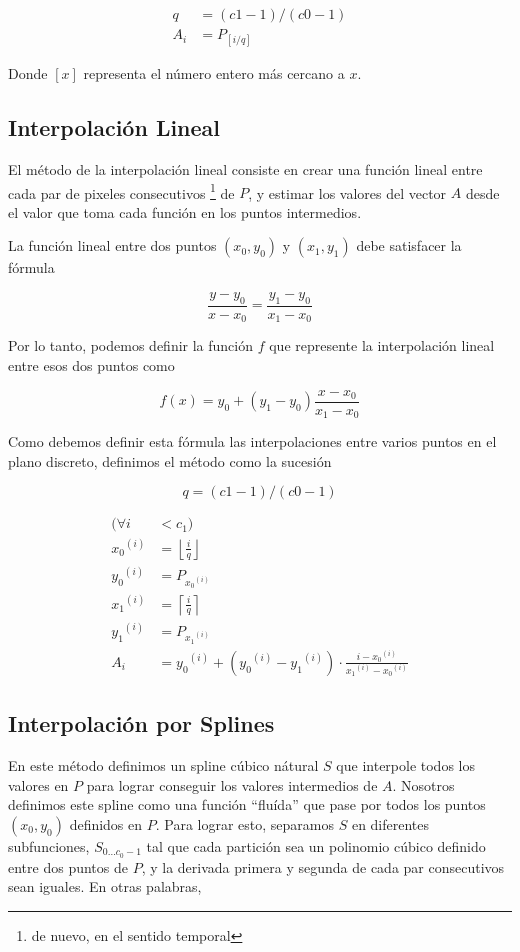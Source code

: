 \[
\begin{split}
q & = (c1 - 1) / (c0 - 1) \\
A_i & = P_{\left[i / q \right]}
\end{split}
\]

Donde $\left[x\right]$ representa el n\'umero entero m\'as cercano a $x$.

\subsection{Interpolaci\'on Lineal}

El m\'etodo de la interpolaci\'on lineal consiste en crear una funci\'on lineal
entre cada par de pixeles consecutivos \footnote{de nuevo, en el sentido
temporal} de $P$, y estimar los valores del vector $A$ desde el valor que toma
cada funci\'on en los puntos intermedios.

La funci\'on lineal entre dos puntos $\left(x_0, y_0\right)$ y $\left(x_1,
y_1\right)$ debe satisfacer la f\'ormula

\[
\frac{y - y_0}{x - x_0} = \frac{y_1 - y_0}{x_1 - x_0}
\]

Por lo tanto, podemos definir la funci\'on $f$ que represente la interpolaci\'on
lineal entre esos dos puntos como

\[
f(x) = y_0 + (y_1 - y_0) \frac{x - x_0}{x_1 - x_0}
\]

Como debemos definir esta f\'ormula las interpolaciones entre varios puntos en
el plano discreto, definimos el m\'etodo como la sucesi\'on

\[
q = (c1 - 1) / (c0 - 1)
\]

\[
\begin{split}
(\forall i & < c_1) \\
{x_0}^{(i)} & = \left\lfloor \frac{i}{q} \right\rfloor \\
{y_0}^{(i)} & = P_{{x_0}^{(i)}} \\
{x_1}^{(i)} & = \left\lceil \frac{i}{q} \right\rceil \\
{y_1}^{(i)} & = P_{{x_1}^{(i)}} \\
A_i & = {y_0}^{(i)} + ({y_0}^{(i)} - {y_1}^{(i)}) \cdot \frac{i - {x_0}^{(i)}}{{x_1}^{(i)} - {x_0}^{(i)}}
\end{split}
\]

\subsection{Interpolaci\'on por Splines}

En este m\'etodo definimos un spline c\'ubico n\'atural $S$ que interpole todos
los valores en $P$ para lograr conseguir los valores intermedios de $A$.
Nosotros definimos este spline como una funci\'on ``flu\'ida'' que pase por
todos los puntos $(x_0, y_0)$ definidos en $P$. Para lograr esto, separamos $S$
en diferentes subfunciones, $S_{0 \ldots c_0 - 1}$ tal que cada partici\'on sea
un polinomio c\'ubico definido entre dos puntos de $P$, y la derivada primera y
segunda de cada par consecutivos sean iguales. En otras palabras,

